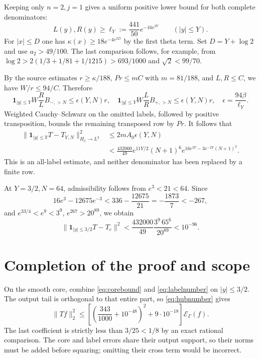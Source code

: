 \documentclass[11pt]{article}
\theoremstyle{remark}\newtheorem{remark}[theorem]{Remark}
\newcommand{\E}{\mathcal E}
\newcommand{\norm}[1]{\lVert #1\rVert}
\numberwithin{equation}{section}
\begin{document}
Keeping only $n=2,j=1$ gives a uniform positive lower bound for both complete denominators:
\begin{equation}\label{eq:ell}
 L(y),R(y)\ge\ell_Y:=\frac{441}{50}e^{-16e^{2Y}}
 \qquad(|y|\le Y).
\end{equation}
For $|x|\le D$ one has $\kappa(x)\ge18e^{-4e^{2D}}$ by the first theta term. Set $D=Y+\log2$ and use $a_2>49/100$.
The last comparison follows, for example, from
$\log2>2(1/3+1/81+1/1215)>693/1000$ and $\sqrt2<99/70$.

By the source estimates $r\ge\kappa/188$, $Pr\le mC$ with $m=81/188$, and $L,R\le C$, we have $W/r\le94/C$. Therefore
\[
 \mathbf1_{|y|\le Y}W\frac RL B_{-,>N}\le\epsilon(Y,N)r,
 \quad
 \mathbf1_{|y|\le Y}W\frac LR B_{+,>N}\le\epsilon(Y,N)r,
 \quad \epsilon=\frac{94\beta}{\ell_Y}.
\]
Weighted Cauchy--Schwarz on the omitted labels, followed by positive transposition, bounds the remaining transposed row by $Pr$. It follows that
\begin{align}
 \norm{\mathbf1_{|y|\le Y}T-T_{Y,N}}_{H_\E\to L^2}^2
 &\le2mA_0\epsilon(Y,N)\nonumber\\
 &<\frac{432000}{49}e^{11Y/2}(N+1)^6
       e^{16e^{2Y}-3e^{-2Y}(N+1)^2}.\label{eq:labeltail}
\end{align}
This is an all-label estimate, and neither denominator has been replaced by a finite row.

At $Y=3/2,N=64$, admissibility follows from $e^3<21<64$. Since
\[
 16e^3-12675e^{-3}<336-\frac{12675}{21}
 =-\frac{1873}{7}<-267,
\]
and $e^{33/4}<e^9<3^9$, $e^{267}>20^{89}$, we obtain
\begin{equation}\label{eq:labelnumber}
 \norm{\mathbf1_{|y|\le3/2}T-T_c}^2
 <\frac{432000}{49}\frac{3^9\,65^6}{20^{89}}<10^{-96}.
\end{equation}

\section{Completion of the proof and scope}\label{sec:conclusion}
On the smooth core, combine \eqref{eq:corebound} and
\eqref{eq:labelnumber} on $|y|\le3/2$. The output tail is orthogonal to that entire part, so \eqref{eq:hubnumber} gives
\[
 \norm{Tf}_2^2
 \le\left[\left(\frac{343}{1000}+10^{-48}\right)^2
                     +9\cdot10^{-18}\right]\E_\Gamma(f).
\]
The last coefficient is strictly less than $3/25<1/8$ by an exact rational comparison. The core and label errors share their output support, so their norms must be added before squaring; omitting their cross term would be incorrect.
\end{document}
